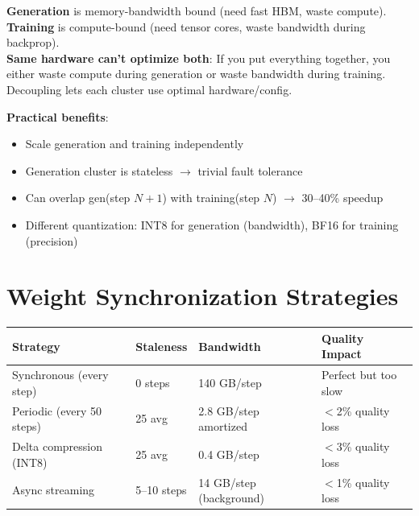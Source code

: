 \begin{keybox}
\textbf{Generation} is memory-bandwidth bound (need fast HBM, waste compute).\\

\textbf{Training} is compute-bound (need tensor cores, waste bandwidth during backprop).\\

\textbf{Same hardware can’t optimize both}: If you put everything together, you either waste compute during generation or waste bandwidth during training. Decoupling lets each cluster use optimal hardware/config.

\textbf{Practical benefits}:

\begin{itemize}
  \item Scale generation and training independently
  \item Generation cluster is stateless $\rightarrow$ trivial fault tolerance
  \item Can overlap gen(step $N+1$) with training(step $N$) $\rightarrow$ 30--40\% speedup
  \item Different quantization: INT8 for generation (bandwidth), BF16 for training (precision)
\end{itemize}
\end{keybox}

\section{Weight Synchronization Strategies}
\label{weight-synchronization-strategies}

{\small
\begin{tabular}{@{}llll@{}}
\toprule
\textbf{Strategy} & \textbf{Staleness} & \textbf{Bandwidth} & \textbf{Quality Impact} \\
\midrule
Synchronous (every step) & 0 steps & 140 GB/step & Perfect but too slow \\
Periodic (every 50 steps) & 25 avg & 2.8 GB/step amortized & $<$2\% quality loss \\
Delta compression (INT8) & 25 avg & 0.4 GB/step & $<$3\% quality loss \\
Async streaming & 5--10 steps & 14 GB/step (background) & $<$1\% quality loss \\
\bottomrule
\end{tabular}
}

